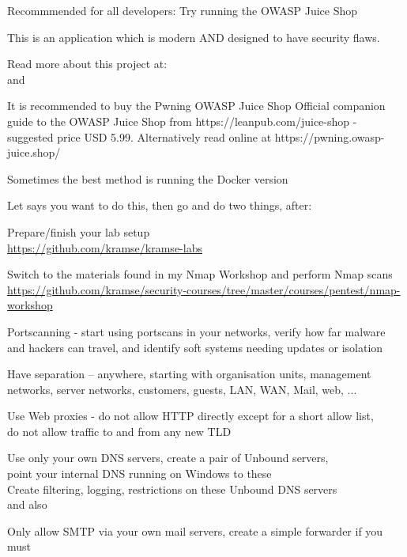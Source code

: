 \documentclass[Screen16to9,17pt]{foils}
\begin{document}

\begin{list1}
\item Recommmended for all developers: Try running the OWASP Juice Shop
\item This is an application which is modern AND designed to have security flaws.
\item Read more about this project at:\\
 and\\ 
\item It is recommended to buy the Pwning OWASP Juice Shop Official companion guide to the OWASP Juice Shop from https://leanpub.com/juice-shop - suggested price USD 5.99. Alternatively read online at https://pwning.owasp-juice.shop/
\item Sometimes the best method is running the Docker version
\end{list1}



\begin{list2}
\item Let says you want to do this, then go and do two things, after:
\item Prepare/finish your lab setup\\
\url{https://github.com/kramse/kramse-labs}

\item Switch to the materials found in my Nmap Workshop and perform Nmap scans\\
\url{https://github.com/kramse/security-courses/tree/master/courses/pentest/nmap-workshop}
\end{list2}





\begin{list2}
\item Portscanning - start using portscans in your networks, verify how far malware and hackers can travel, and identify soft systems needing updates or isolation
\item Have separation -- anywhere, starting with organisation units, management networks, server networks, customers, guests, LAN, WAN, Mail, web, ...
\item Use Web proxies - do not allow HTTP directly except for a short allow list, \\
do not allow traffic to and from any new TLD
\item Use only your own DNS servers, create a pair of Unbound servers, \\
point your internal DNS running on Windows to these\\
Create filtering, logging, restrictions on these Unbound DNS servers\\
 and also 
\item Only allow SMTP via your own mail servers, create a simple forwarder if you must
\end{list2}
\end{document}

